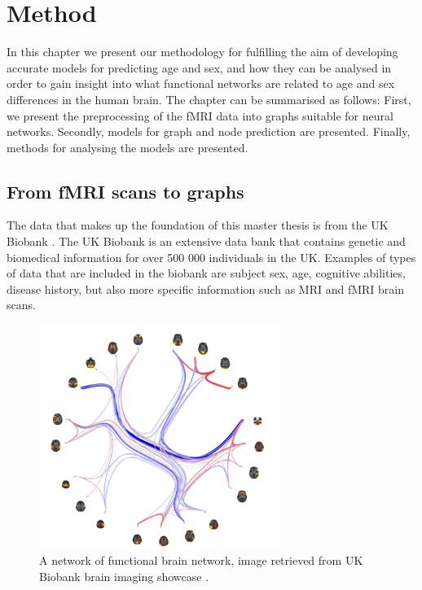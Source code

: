 \chapter{Method}

In this chapter we present our methodology for fulfilling the aim of developing accurate models for predicting age and sex, and how they can be analysed in order to gain insight into what functional networks are related to age and sex differences in the human brain. The chapter can be summarised as follows: First, we present the preprocessing of the fMRI data into graphs suitable for neural networks. Secondly, models for graph and node prediction are presented. Finally, methods for analysing the models are presented.

\section{From fMRI scans to graphs}\label{sec:fmri_to_graphs}
The data that makes up the foundation of this master thesis is from the UK Biobank \cite{ukbiobank}. The UK Biobank is an extensive data bank that contains genetic and biomedical information for over 500 000 individuals in the UK. Examples of types of data that are included in the biobank are subject sex, age, cognitive abilities, disease history, but also more specific information such as MRI and fMRI brain scans. 

\begin{figure}[H]
    \centering
    \includegraphics[width=0.7\textwidth]{chapters/images_methods/fmri_network.PNG}
    \caption{A network of functional brain network, image retrieved from UK Biobank brain imaging showcase  \cite{ukbiobank_brain_imaging}.}
    \label{fig:fmri_network}
\end{figure}

